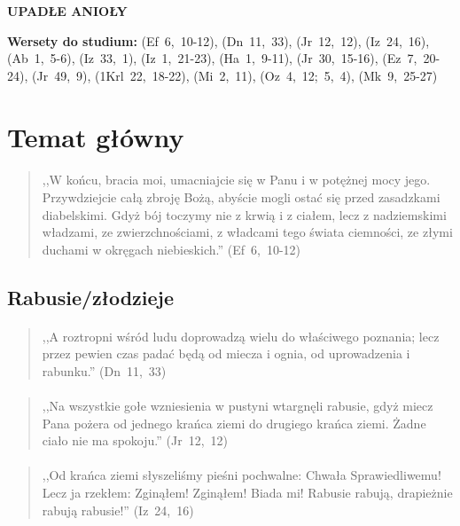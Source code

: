 \documentclass[10pt,a4paper,oneside]{article}
\begin{document}
\centerline{\textbf{\MakeUppercase{Upadłe Anioły}}}
\begin{center}
\textbf{Wersety do studium:} 
\mbox{(Ef 6, 10-12)}, \mbox{(Dn 11, 33)}, \mbox{(Jr 12, 12)}, \mbox{(Iz 24, 16)}, \mbox{(Ab 1, 5-6)}, \mbox{(Iz 33, 1)}, \mbox{(Iz 1, 21-23)}, \mbox{(Ha 1, 9-11)}, \mbox{(Jr 30, 15-16)}, \mbox{(Ez 7, 20-24)}, \mbox{(Jr 49, 9)}, \mbox{(1Krl 22, 18-22)}, \mbox{(Mi 2, 11)}, \mbox{(Oz 4, 12; 5, 4)}, \mbox{(Mk 9, 25-27)}
\end{center}
\section{Temat główny}
\paragraph{}
\begin{quote}
,,W końcu, bracia moi, umacniajcie się w Panu i w potężnej mocy jego. Przywdziejcie całą zbroję Bożą, abyście mogli ostać się przed zasadzkami diabelskimi. Gdyż bój toczymy nie z krwią i z ciałem, lecz z nadziemskimi władzami, ze zwierzchnościami, z władcami tego świata ciemności, ze złymi duchami w okręgach niebieskich.'' \mbox{(Ef 6, 10-12)}
\end{quote}
\subsection{Rabusie/złodzieje}
\paragraph{}
\begin{quote}
,,A roztropni wśród ludu doprowadzą wielu do właściwego poznania; lecz przez pewien czas padać będą od miecza i ognia, od uprowadzenia i rabunku.'' \mbox{(Dn 11, 33)}
\end{quote}
\paragraph{}
\begin{quote}
,,Na wszystkie gołe wzniesienia w pustyni wtargnęli rabusie, gdyż miecz Pana pożera od jednego krańca ziemi do drugiego krańca ziemi. Żadne ciało nie ma spokoju.'' \mbox{(Jr 12, 12)}
\end{quote}
\paragraph{}
\begin{quote}
,,Od krańca ziemi słyszeliśmy pieśni pochwalne: Chwała Sprawiedliwemu! Lecz ja rzekłem: Zginąłem! Zginąłem! Biada mi! Rabusie rabują, drapieżnie rabują rabusie!'' \mbox{(Iz 24, 16)}
\end{quote}
\end{document}
